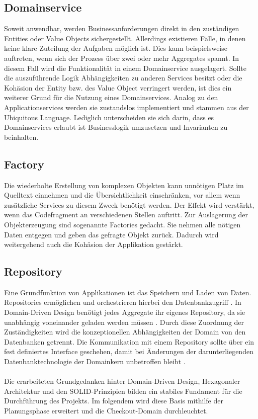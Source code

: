 \subsection{Domainservice}

Soweit anwendbar, werden Businessanforderungen direkt in den zuständigen Entities oder Value Objects sichergestellt. Allerdings existieren Fälle, in denen keine klare Zuteilung der Aufgaben möglich ist. Dies kann beispielsweise auftreten, wenn sich der Prozess über zwei oder mehr Aggregates spannt. In diesem Fall wird die Funktionalität in einem Domainservice ausgelagert. Sollte die auszuführende Logik Abhängigkeiten zu anderen Services besitzt oder die Kohäsion der Entity bzw. des Value Object verringert werden, ist dies ein weiterer Grund für die Nutzung eines Domainservices. Analog zu den Applicationservices werden sie zustandslos implementiert und stammen aus der Ubiquitous Language. Lediglich unterscheiden sie sich darin, dass es Domainservices erlaubt ist Businesslogik umzusetzen und Invarianten zu beinhalten. \cite[S. 268]{Vernon.2015}

\subsection{Factory}

Die wiederholte Erstellung von komplexen Objekten kann unnötigen Platz im Quelltext einnehmen und die Übersichtlichkeit einschränken, vor allem wenn zusätzliche Services zu diesem Zweck benötigt werden. Der Effekt wird verstärkt, wenn das Codefragment an verschiedenen Stellen auftritt. Zur Auslagerung der Objekterzeugung sind sogenannte Factories gedacht. Sie nehmen alle nötigen Daten entgegen und geben das gefragte Objekt zurück. Dadurch wird weitergehend auch die Kohäsion der Applikation gestärkt. \cite[S. 137f.]{Evans.2011}

\subsection{Repository}

Eine Grundfunktion von Applikationen ist das Speichern und Laden von Daten. Repositories ermöglichen und orchestrieren hierbei den Datenbankzugriff \cite[S. 151]{Evans.2011}. In Domain-Driven Design benötigt jedes Aggregate ihr eigenes Repository, da sie unabhängig voneinander geladen werden müssen \cite[S. 401]{Vernon.2015}. Durch diese Zuordnung der Zuständigkeiten wird die konzeptionellen Abhängigkeiten der Domain von den Datenbanken getrennt. Die Kommunikation mit einem Repository sollte über ein fest definiertes Interface geschehen, damit bei Änderungen der darunterliegenden Datenbanktechnologie der Domainkern unbetroffen bleibt \cite[S. 152]{Evans.2011}. \\\\



Die erarbeiteten Grundgedanken hinter Domain-Driven Design, Hexagonaler Architektur und den SOLID-Prinzipien bilden ein stabiles Fundament für die Durchführung des Projekts. Im folgendem wird diese Basis mithilfe der Planungsphase erweitert und die Checkout-Domain durchleuchtet.
